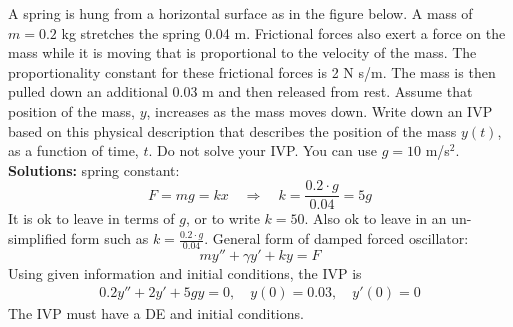 \ifnum {}

\question[3] A spring is hung from a horizontal surface as in the figure below. A mass of $m=0.2$ kg stretches the spring 0.04 m. Frictional forces also exert a force on the mass while it is moving that is proportional to the velocity of the mass. The proportionality constant for these frictional forces is 2 N s/m. The mass is then pulled down an additional 0.03 m and then released from rest. Assume that position of the mass, $y$, increases as the mass moves down. Write down an IVP based on this physical description that describes the position of the mass $y(t)$, as a function of time, $t$. Do not solve your IVP. You can use $g = 10$ m/s$^2$. \\[4pt]


\ifnum {} {\color{DarkBlue} 
\textbf{Solutions:} spring constant:
$$F  = m g = kx \quad \Rightarrow \quad k = \frac{0.2\cdot g }{0.04} = 5g$$
It is ok to leave in terms of $g$, or to write $k=50$. Also ok to leave in an un-simplified form such as $\displaystyle k = \frac{0.2\cdot g }{0.04}$.
General form of damped forced oscillator:
$$my'' + \gamma y' + ky = F$$
Using given information and initial conditions, the IVP is
\begin{align}
    0.2 y'' + 2 y' + 5gy = 0, \quad y(0) = 0.03, \quad y'(0) = 0
\end{align}
The IVP must have a DE and initial conditions. 
} 
\else 
\vfill
\fi
\fi 
